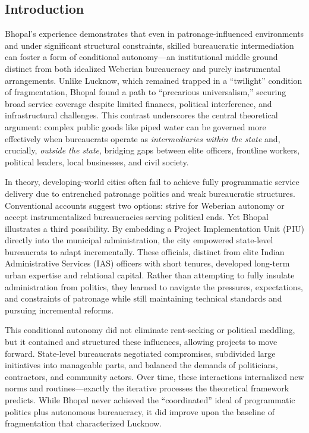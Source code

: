 \subsection{Introduction}

Bhopal’s experience demonstrates that even in patronage-influenced environments and under significant structural constraints, skilled bureaucratic intermediation can foster a form of conditional autonomy—an institutional middle ground distinct from both idealized Weberian bureaucracy and purely instrumental arrangements. Unlike Lucknow, which remained trapped in a “twilight” condition of fragmentation, Bhopal found a path to “precarious universalism,” securing broad service coverage despite limited finances, political interference, and infrastructural challenges. This contrast underscores the central theoretical argument: complex public goods like piped water can be governed more effectively when bureaucrats operate as \textit{intermediaries within the state} and, crucially, \textit{outside the state}, bridging gaps between elite officers, frontline workers, political leaders, local businesses, and civil society.

In theory, developing-world cities often fail to achieve fully programmatic service delivery due to entrenched patronage politics and weak bureaucratic structures. Conventional accounts suggest two options: strive for Weberian autonomy or accept instrumentalized bureaucracies serving political ends. Yet Bhopal illustrates a third possibility. By embedding a Project Implementation Unit (PIU) directly into the municipal administration, the city empowered state-level bureaucrats to adapt incrementally. These officials, distinct from elite Indian Administrative Services (IAS) officers with short tenures, developed long-term urban expertise and relational capital. Rather than attempting to fully insulate administration from politics, they learned to navigate the pressures, expectations, and constraints of patronage while still maintaining technical standards and pursuing incremental reforms.

This conditional autonomy did not eliminate rent-seeking or political meddling, but it contained and structured these influences, allowing projects to move forward. State-level bureaucrats negotiated compromises, subdivided large initiatives into manageable parts, and balanced the demands of politicians, contractors, and community actors. Over time, these interactions internalized new norms and routines—exactly the iterative processes the theoretical framework predicts. While Bhopal never achieved the “coordinated” ideal of programmatic politics plus autonomous bureaucracy, it did improve upon the baseline of fragmentation that characterized Lucknow.

